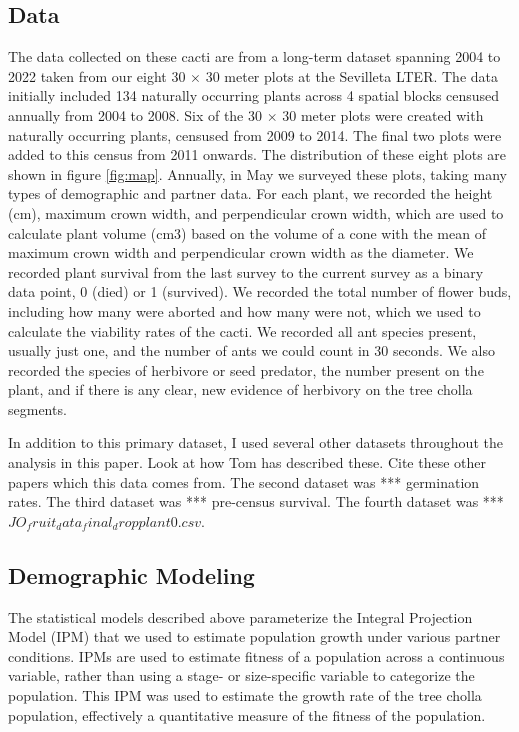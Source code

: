 \documentclass[12pt,a4paper]{article}
\begin{document}
	\subsection*{Data}
	
	The data collected on these cacti are from a long-term dataset spanning 2004 to 2022 taken from our eight 30 $\times$ 30 meter plots at the Sevilleta LTER. 
	The data initially included 134 naturally occurring plants across 4 spatial blocks censused annually from 2004 to 2008.
	Six of the 30 $\times$ 30 meter plots were created with naturally occurring plants, censused from 2009 to 2014. 
	The final two plots were added to this census from 2011 onwards. 
	The distribution of these eight plots are shown in figure \ref{fig:map}.
		Annually, in May we surveyed these plots, taking many types of demographic and partner data. 
		For each plant, we recorded the height (cm), maximum crown width, and perpendicular crown width, which are used to calculate plant volume (cm3) based on the volume of a cone with the mean of maximum crown width and perpendicular crown width as the diameter. 
		We recorded plant survival from the last survey to the current survey as a binary data point, 0 (died) or 1 (survived). 
		We recorded the total number of flower buds, including how many were aborted and how many were not, which we used to calculate the viability rates of the cacti. 
		We recorded all ant species present, usually just one, and the number of ants we could count in 30 seconds. 
		We also recorded the species of herbivore or seed predator, the number present on the plant, and if there is any clear, new evidence of herbivory on the tree cholla segments. 
		
		In addition to this primary dataset, I used several other datasets throughout the analysis in this paper.  Look at how Tom has described these. Cite these other papers which this data comes from. 
		The second dataset was *** germination rates.
		The third dataset was *** pre-census survival.
		The fourth dataset was *** $JO_fruit_data_final_dropplant0.csv$.
		
		\subsection*{Demographic Modeling}
		
		The statistical models described above parameterize the Integral Projection Model (IPM) that we used to estimate population growth under various partner conditions.  
		IPMs are used to estimate fitness of a population across a continuous variable, rather than using a stage- or size-specific variable to categorize the population. 
		This IPM was used to estimate the growth rate of the tree cholla population, effectively a quantitative measure of the fitness of the population. 
		
\end{document}
